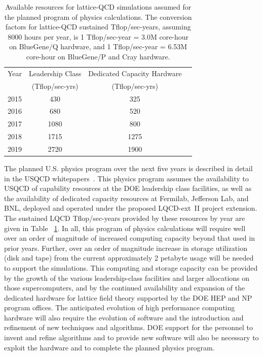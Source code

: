 \begin{table}[t]
\begin{center}
\caption{Available resources for lattice-QCD simulations assumed for the planned program of physics calculations.  The conversion factors for lattice-QCD sustained
Tflop/sec-years, assuming 8000 hours per year, is 1 Tflop/sec-year = 3.0M core-hour on BlueGene/Q hardware, and 1 Tflop/sec-year = 6.53M core-hour on BlueGene/P and Cray hardware. \vspace{1.5mm}}
\label{tab:fiveyear}
\begin{tabular}{lccc}
\hline\hline  
Year & Leadership Class  & Dedicated Capacity Hardware  \\[-0.75mm] 
& (Tflop/sec-yrs) & (Tflop/sec-yrs) \\[0.5mm] \hline
2015 & 430 & 325 \\
2016 & 680 & 520 \\
2017 & 1080 & 800 \\
2018 & 1715 & 1275 \\ 
2019 & 2720 & 1900 \\ \hline\hline
\end{tabular}
\end{center}
\end{table}

The planned U.S. physics program over the next five years is described in detail
in the USQCD
whitepapers~\cite{USQCD_EF_whitepaper13,USQCD_IF_whitepaper13,USQCD_NP_whitepaper13,USQCD_Thermo_whitepaper13}.
This physics program assumes the availability to USQCD of capability resources
at the DOE leadership class facilities, as well as the availability of dedicated
capacity resources at Fermilab, Jefferson Lab, and BNL, deployed and operated
under the proposed LQCD-ext~II project extension.  The sustained LQCD Tflop/sec-years provided by
these resources by year are given in Table ~\ref{tab:fiveyear}. In all, this
program of physics calculations 
will require well over an order of magnitude of increased computing capacity
beyond that used in prior years.  Further, over an order of magnitude increase
in storage utilization (disk and tape) from the current approximately 2
petabyte usage will be needed to support the simulations.   This computing and
storage capacity can be provided by the growth
of the various leadership-class facilities and larger allocations on those
supercomputers, and by the continued availability and expansion of the
dedicated hardware for lattice field theory supported by the DOE HEP and NP
program offices.  The anticipated evolution of high performance computing
hardware will also require the evolution of software and the introduction and
refinement of new techniques and algorithms.  DOE support for the personnel to
invent and refine algorithms and to provide new software will also be necessary to
exploit the hardware and to complete the planned physics program.

